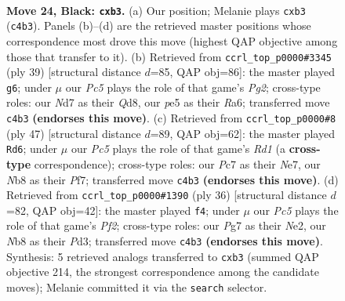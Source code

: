 \documentclass[11pt]{article}
\begin{document}
\clearpage

\begin{figure}[p]\centering
\begin{subfigure}{0.46\textwidth}\centering
\resizebox{\linewidth}{!}{%
\newchessgame
\chessboard[
  setfen={rn2r1k1/2pnq1pp/1p2p3/p3Pp2/2pP1P1P/PP3NNQ/2PK2P1/1R5R b - - 0 24},
  showmover=false,
  pgfstyle=straightmove, color=movearrow, markmove={c4-b3}
]}
\caption{}
\end{subfigure}\hfill
\begin{subfigure}{0.46\textwidth}\centering
\resizebox{\linewidth}{!}{%
\newchessgame
\chessboard[
  setfen={3q1rk1/5ppp/rp1np2P/1npp4/p2P1PP1/P1P2N2/1P3P1Q/R2NK2R b KQ - 0 20},
  showmover=false,
  pgfstyle=straightmove, color=movearrow, markmove={g7-g6}
]}
\caption{}
\end{subfigure}
\\[4pt]
\begin{subfigure}{0.46\textwidth}\centering
\resizebox{\linewidth}{!}{%
\newchessgame
\chessboard[
  setfen={3rr1k1/2p1npp1/p3qn1p/Pp2p3/1P2P3/2P1NN1P/2Q2PP1/R2R2K1 b - - 2 24},
  showmover=false,
  pgfstyle=straightmove, color=movearrow, markmove={d8-d6}
]}
\caption{}
\end{subfigure}\hfill
\begin{subfigure}{0.46\textwidth}\centering
\resizebox{\linewidth}{!}{%
\newchessgame
\chessboard[
  setfen={r4rk1/pn1qn3/1p1p2pp/1Pp1p3/2P1N2P/P2P2P1/1Q2NP2/R3K2R w KQ - 0 19},
  showmover=false,
  pgfstyle=straightmove, color=movearrow, markmove={f2-f4}
]}
\caption{}
\end{subfigure}
\caption{\textbf{Move 24, Black: \texttt{cxb3}.} (a) Our position; Melanie plays \texttt{cxb3} (\texttt{c4b3}). Panels (b)--(d) are the retrieved master positions whose correspondence most drove this move (highest QAP objective among those that transfer to it). (b) Retrieved from \texttt{ccrl\_top\_p0000\#3345} (ply 39) [structural distance $d$=85, QAP obj=86]: the master played \texttt{g6}; under $\mu$ our \emph{Pc5} plays the role of that game's \emph{Pg2}; cross-type roles: our \emph{N}d7 as their \emph{Q}d8, our \emph{p}e5 as their \emph{R}a6; transferred move \texttt{c4b3} \textbf{(endorses this move)}. (c) Retrieved from \texttt{ccrl\_top\_p0000\#8} (ply 47) [structural distance $d$=89, QAP obj=62]: the master played \texttt{Rd6}; under $\mu$ our \emph{Pc5} plays the role of that game's \emph{Rd1} (a \textbf{cross-type} correspondence); cross-type roles: our \emph{P}c7 as their \emph{N}e7, our \emph{N}b8 as their \emph{P}f7; transferred move \texttt{c4b3} \textbf{(endorses this move)}. (d) Retrieved from \texttt{ccrl\_top\_p0000\#1390} (ply 36) [structural distance $d$=82, QAP obj=42]: the master played \texttt{f4}; under $\mu$ our \emph{Pc5} plays the role of that game's \emph{Pf2}; cross-type roles: our \emph{P}g7 as their \emph{N}e2, our \emph{N}b8 as their \emph{P}d3; transferred move \texttt{c4b3} \textbf{(endorses this move)}. Synthesis: 5 retrieved analogs transferred to \texttt{cxb3} (summed QAP objective 214, the strongest correspondence among the candidate moves); Melanie committed it via the \texttt{search} selector.}
\label{fig:thought-m47}
\end{figure}
\end{document}
